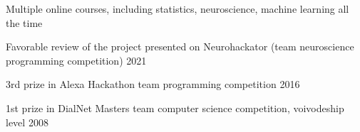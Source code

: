 \documentclass[letter,10pt]{article}
\begin{document}
Multiple online courses, including statistics, neuroscience, machine learning \hfill all the time

Favorable review of the project presented on Neurohackator (team neuroscience programming competition) \hfill 2021


3rd prize in Alexa Hackathon team programming competition \hfill 2016

1st prize in DialNet Masters team computer science competition, voivodeship level \hfill 2008
\end{document}
